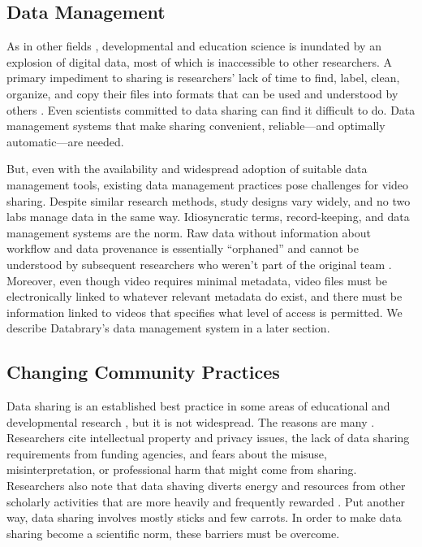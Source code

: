 \documentclass[letterpaper,man,apacite]{apa6}
\begin{document}
\subsection{Data Management}

As in other fields \cite{Overpeck2011}, developmental and education science is inundated by an explosion of digital data, most of which is inaccessible to other researchers.
A primary impediment to sharing is researchers’ lack of time to find, label, clean, organize, and copy their files into formats that can be used and understood by others \cite{Ascoli2006}. 
Even scientists committed to data sharing can find it difficult to do. 
Data management systems that make sharing convenient, reliable—and optimally automatic—are needed.

But, even with the availability and widespread adoption of suitable data management tools, existing data management practices pose challenges for video sharing.
Despite similar research methods, study designs vary widely, and no two labs manage data in the same way. 
Idiosyncratic terms, record-keeping, and data management systems are the norm. 
Raw data without information about workflow and data provenance is essentially “orphaned” and cannot be understood by subsequent researchers who weren’t part of the original team \cite{curry2011}. 
Moreover, even though video requires minimal metadata, video files must be electronically linked to whatever relevant metadata do exist, and there must be information linked to videos that specifies what level of access is permitted. 
We describe Databrary's data management system in a later section.

\subsection{Changing Community Practices}
Data sharing is an established best practice in some areas of educational and developmental research \cite{AERA-Code-2011}, but it is not widespread.
The reasons are many \cite{Ascoli2006b,Ferguson2014}.
Researchers cite intellectual property and privacy issues, the lack of data sharing requirements from funding agencies, and fears about the misuse, misinterpretation, or professional harm that might come from sharing.
Researchers also note that data shaving diverts energy and resources from other scholarly activities that are more heavily and frequently rewarded \cite{Ascoli2006b,Ferguson2014}.
Put another way, data sharing involves mostly sticks and few carrots.
In order to make data sharing become a scientific norm, these barriers must be overcome.
\end{document}
